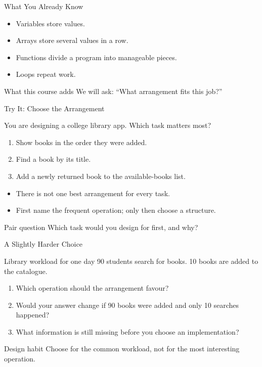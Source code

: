 \documentclass[aspectratio=169]{beamer}
\begin{document}
\begin{frame}{What You Already Know}
  \begin{itemize}
    \item Variables store values.
    \item Arrays store several values in a row.
    \item Functions divide a program into manageable pieces.
    \item Loops repeat work.
  \end{itemize}
  \vspace{0.2cm}
  \begin{exampleblock}{What this course adds}
    We will ask: ``What arrangement fits this job?''
  \end{exampleblock}
\end{frame}

\begin{frame}{Try It: Choose the Arrangement}
  \begin{block}{You are designing a college library app. Which task matters most?}
    \begin{enumerate}
      \item Show books in the order they were added.
      \item Find a book by its title.
      \item Add a newly returned book to the available-books list.
    \end{enumerate}
  \end{block}
  \begin{itemize}
    \item There is not one best arrangement for every task.
    \item First name the frequent operation; only then choose a structure.
  \end{itemize}
  \begin{exampleblock}{Pair question}
    Which task would you design for first, and why?
  \end{exampleblock}
\end{frame}

\begin{frame}{A Slightly Harder Choice}
  \begin{block}{Library workload for one day}
    90 students search for books. 10 books are added to the catalogue.
  \end{block}
  \begin{enumerate}
    \item Which operation should the arrangement favour?
    \item Would your answer change if 90 books were added and only 10 searches happened?
    \item What information is still missing before you choose an implementation?
  \end{enumerate}
  \begin{exampleblock}{Design habit}
    Choose for the common workload, not for the most interesting operation.
  \end{exampleblock}
\end{frame}
\end{document}
